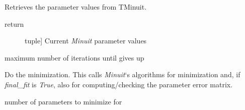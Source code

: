 \documentclass[a4paper,10pt,english]{sphinxmanual}
\begin{document}
\begin{fulllineitems}
\begin{fulllineitems}
\begin{description}
\end{description}

\end{fulllineitems}


\begin{fulllineitems}
\label{index:kafe.minuit.Minuit.get_parameter_values}
Retrieves the parameter values from TMinuit.
\begin{description}
\item[{return}] \leavevmode{[}tuple{]}
Current \emph{Minuit} parameter values

\end{description}

\end{fulllineitems}


\begin{fulllineitems}
\label{index:kafe.minuit.Minuit.max_iterations}
maximum number of iterations until  gives up

\end{fulllineitems}


\begin{fulllineitems}
\label{index:kafe.minuit.Minuit.minimize}
Do the minimization. This calls \emph{Minuit}`s algorithms 
for minimization and, if \emph{final\_fit} is \emph{True}, also 
for computing/checking the parameter error matrix.

\end{fulllineitems}


\begin{fulllineitems}
\label{index:kafe.minuit.Minuit.number_of_parameters}
number of parameters to minimize for

\end{fulllineitems}



\end{fulllineitems}
\end{document}
